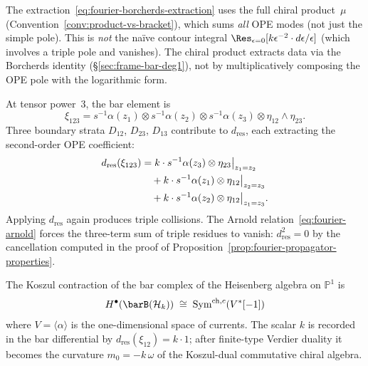 \begin{remark}\label{rem:fourier-borcherds}
The extraction~\eqref{eq:fourier-borcherds-extraction} uses the
full chiral product~$\mu$
(Convention~\ref{conv:product-vs-bracket}),
which sums \emph{all} OPE modes (not just the simple pole).
This is \emph{not} the na\"ive contour integral
$\Res_{\epsilon = 0}[k\epsilon^{-2} \cdot d\epsilon/\epsilon]$
(which involves a triple pole and vanishes).
The chiral product extracts data via the Borcherds identity
(\S\ref{sec:frame-bar-deg1}), not by multiplicatively composing
the OPE pole with the logarithmic form.
\end{remark}

\begin{computation}[\texorpdfstring{$n = 3$}{n = 3}; \ClaimStatusProvedHere]
\label{comp:fourier-heisenberg-n3}
At tensor power~$3$, the bar element is
\[
\xi_{123} = s^{-1}\alpha(z_1) \otimes s^{-1}\alpha(z_2)
 \otimes s^{-1}\alpha(z_3)
 \otimes \eta_{12} \wedge \eta_{23}.
\]
Three boundary strata $D_{12}$, $D_{23}$, $D_{13}$ contribute to
$d_{\mathrm{res}}$, each extracting the second-order OPE coefficient:
\begin{align}
d_{\mathrm{res}}(\xi_{123})
&= k \cdot s^{-1}\alpha(z_3) \otimes
 \eta_{23}\big|_{z_1 = z_2}
\notag \\
&\quad + k \cdot s^{-1}\alpha(z_1) \otimes
 \eta_{12}\big|_{z_2 = z_3}
\notag \\
&\quad + k \cdot s^{-1}\alpha(z_2) \otimes
 \eta_{12}\big|_{z_1 = z_3}.
\label{eq:fourier-dres-n3}
\end{align}
Applying $d_{\mathrm{res}}$ again produces triple collisions.
The Arnold relation~\eqref{eq:fourier-arnold} forces the three-term
sum of triple residues to vanish:
$d_{\mathrm{res}}^2 = 0$ by the cancellation computed in the proof of
Proposition~\ref{prop:fourier-propagator-properties}.
\end{computation}

\begin{theorem}
\label{thm:fourier-heisenberg-bar}
The Koszul contraction of the bar complex of the Heisenberg algebra on
$\mathbb{P}^1$ is
\begin{equation}\label{eq:fourier-heisenberg-bar}
H^\bullet(\barB(\mathcal{H}_k)) \;\cong\;
\operatorname{Sym}^{\mathrm{ch},c}(V^*[-1])
\end{equation}
where $V = \langle\alpha\rangle$ is the one-dimensional space of
currents. The scalar $k$ is recorded in the bar differential by
$d_{\mathrm{res}}(\xi_{12})=k\cdot1$; after finite-type Verdier
duality it becomes the curvature $m_0=-k\,\omega$ of the Koszul-dual
commutative chiral algebra.
\end{theorem}

